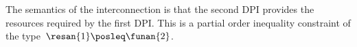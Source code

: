 


The semantics of the interconnection is that the second DPI provides the resources required by the first DPI.
This is a partial order inequality constraint of the type~$\resan{1}\posleq\funan{2}$.


